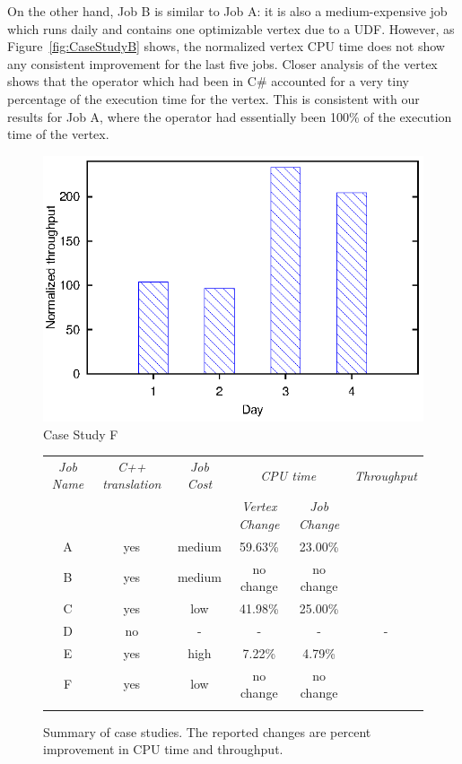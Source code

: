 On the other hand, Job B is similar to Job A: it is also a medium-expensive job which runs daily and contains one optimizable vertex due to a UDF.
However, as Figure~\ref{fig:CaseStudyB} shows, the normalized vertex CPU time does not show any consistent improvement for the last five jobs.
Closer analysis of the vertex shows that the operator which had been in C\# accounted for a very tiny percentage of the execution time for the vertex.
This is consistent with our results for Job A, where the operator had essentially been 100\% of the execution time of the vertex.
\begin{figure}[ht]
\includegraphics{graphs/throughtputF}
\caption{Case Study F \label{fig:CaseStudyF}}
\end{figure}
\begin{figure}[ht]

\begin{tabular}{c|c|c|c|c|c} 
\toprule
  {\em Job Name} & {\em C++ translation}&{\em Job Cost} & \multicolumn{2}{c}{\em CPU time} &  {\em Throughput } \\
  \cmidrule{4-5}  
  & & & {\em Vertex Change} & {\em Job Change} &  \\
  \midrule

A & yes & medium & 59.63\%  & 23.00\% & \todo{}\\
B &yes & medium & no change & no change & \todo{}\\
C & yes & low    & 41.98\%  & 25.00\% & \todo{}\\
D & no & - & - & - & -\\
E & yes & high   & 7.22\%   & 4.79\% & \todo{} \\
F & yes & low & no change & no change & \todo{}\\

\label{fig:caseStudySummary}
\end{tabular}
\caption{Summary of case studies. The reported changes are percent improvement in CPU time and throughput.}
\end{figure}

